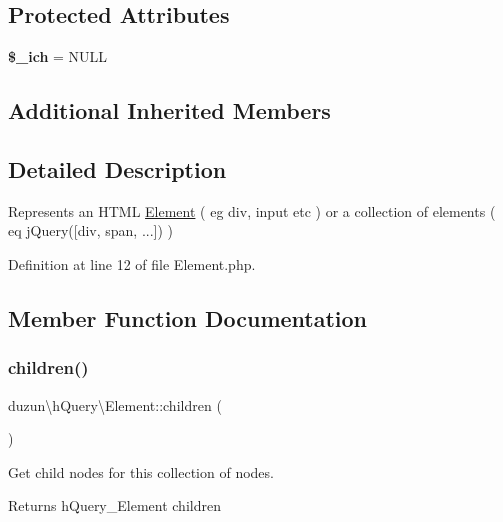 \subsection*{Protected Attributes}
\begin{DoxyCompactItemize}
\item 
\mbox{\label{classduzun_1_1hQuery_1_1Element_a8c6a560fddaeff4edca11742d328b20b}} 
{\bfseries \$\+\_\+ich} = N\+U\+LL
\end{DoxyCompactItemize}
\subsection*{Additional Inherited Members}


\subsection{Detailed Description}
Represents an H\+T\+ML \mbox{\hyperlink{classduzun_1_1hQuery_1_1Element}{Element}} ( eg div, input etc ) or a collection of elements ( eq j\+Query(\mbox{[}div, span, ...\mbox{]}) ) 

Definition at line 12 of file Element.\+php.



\subsection{Member Function Documentation}
\mbox{\label{classduzun_1_1hQuery_1_1Element_ab19b0b422c54a00c0165543b5020253c}} 
\subsubsection{\texorpdfstring{children()}{children()}}
{\footnotesize\ttfamily duzun\textbackslash{}h\+Query\textbackslash{}\+Element\+::children (\begin{DoxyParamCaption}{ }\end{DoxyParamCaption})}

Get child nodes for this collection of nodes.

\begin{DoxyReturn}{Returns}
h\+Query\+\_\+\+Element children 
\end{DoxyReturn}


